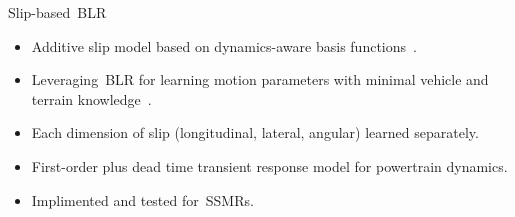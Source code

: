 \documentclass[final,hyperref={pdfpagelabels=false}]{beamer}
\begin{document}
\begin{frame}[t]
\begin{columns}[t]
\begin{column}{.465\textwidth}
\begin{block}{Slip-based~\acf{BLR}}
	
	\begin{itemize}
		\item Additive slip model based on dynamics-aware basis functions~\cite{Seegmiller2013}.
		\item Leveraging~\acf{BLR} for learning motion parameters with minimal vehicle and terrain knowledge~\cite{McKinnon2019}.
		\item Each dimension of slip (longitudinal, lateral, angular) learned separately.
		\item First-order plus dead time transient response model for powertrain dynamics.
		\item Implimented and tested for~\acp{SSMR}.
	\end{itemize}
	

\end{block}
\end{column}
\end{columns}
\end{frame}
\end{document}
